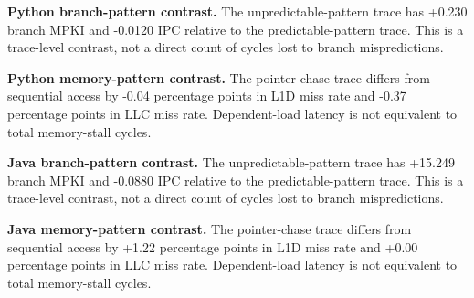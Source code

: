 \textbf{Python branch-pattern contrast.} The unpredictable-pattern trace has +0.230 branch MPKI and -0.0120 IPC relative to the predictable-pattern trace. This is a trace-level contrast, not a direct count of cycles lost to branch mispredictions.

\textbf{Python memory-pattern contrast.} The pointer-chase trace differs from sequential access by -0.04 percentage points in L1D miss rate and -0.37 percentage points in LLC miss rate. Dependent-load latency is not equivalent to total memory-stall cycles.

\textbf{Java branch-pattern contrast.} The unpredictable-pattern trace has +15.249 branch MPKI and -0.0880 IPC relative to the predictable-pattern trace. This is a trace-level contrast, not a direct count of cycles lost to branch mispredictions.

\textbf{Java memory-pattern contrast.} The pointer-chase trace differs from sequential access by +1.22 percentage points in L1D miss rate and +0.00 percentage points in LLC miss rate. Dependent-load latency is not equivalent to total memory-stall cycles.

